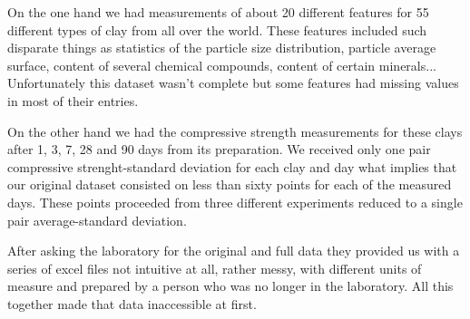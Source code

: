 \documentclass[10pt,conference,compsocconf]{IEEEtran}
\begin{document}
On the one hand we had measurements of about 20 different features for 55 different types of clay from all over the world. These features included such disparate things as statistics of the particle size distribution, particle average surface, content of several chemical compounds, content of certain minerals... Unfortunately this dataset wasn't complete but some features had missing values in most of their entries.

On the other hand we had the compressive strength measurements for these clays after 1, 3, 7, 28 and 90 days from its preparation. We received only one pair compressive strenght-standard deviation for each clay and day what implies that our original dataset consisted on less than sixty points for each of the measured days. These points proceeded from three different experiments reduced to a single pair average-standard deviation.

After asking the laboratory for the original and full data they provided us with a series of excel files not intuitive at all, rather messy, with different units of measure and prepared by a person who was no longer in the laboratory. All this together made that data inaccessible at first.





\end{document}

